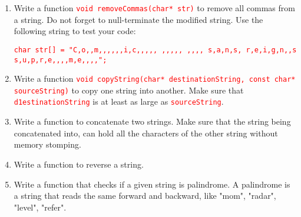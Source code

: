 \documentclass[12pt]{article}
\begin{document}
\begin{enumerate}
    \item Write a function \textcolor{red}{\texttt{void removeCommas(char* str)}} to remove all commas from a string. Do not forget to null-terminate the modified string. Use the following 
    string to test your code:

    \textcolor{red}{\texttt{char str[] = "C,o,,m,,,,,,i,c,,,,,  ,,,,, ,,,, s,a,n,s, r,e,i,g,n,,s s,u,p,r,e,,,,m,e,,,,";}}

    \item Write a function \textcolor{red}{\texttt{void copyString(char* destinationString, const char* sourceString)}} to copy one string into another. Make sure that 
    \textcolor{red}{\texttt{d1estinationString}} is at least as large as \textcolor{red}{\texttt{sourceString}}.

    \item Write a function to concatenate two strings. Make sure that the string being concatenated into, can hold all the characters of the other string without memory stomping.

    \item Write a function to reverse a string.
    
    \item Write a function that checks if a given string is palindrome. A palindrome is a string that reads the same forward and backward, like "mom", "radar", "level", "refer".
\end{enumerate}
\end{document}
